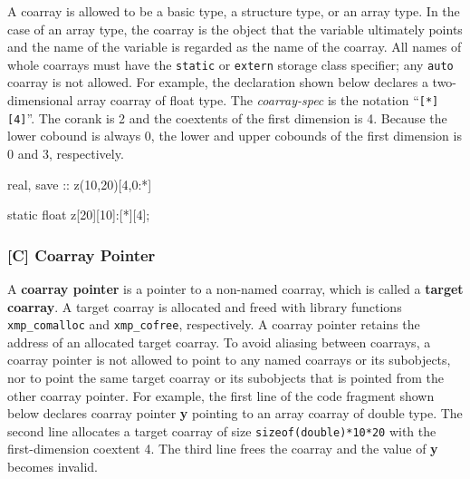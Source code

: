 {\onlyC}
A coarray is allowed to be a basic type, a structure type, or an array type.
In the case of an array type, the coarray is the object that the variable 
ultimately points and the name of the variable is regarded as the 
name of the coarray. 
All names of whole coarrays must have the {\tt static} or {\tt extern}
storage class specifier; any {\tt auto} coarray is not allowed.
For example, the declaration shown below declares a two-dimensional array
coarray of float type. 
The {\it coarray-spec} is the notation ``{\tt [*][4]}''.
The corank is 2 and the coextents of the first dimension is 4.
Because the lower cobound is always 0, the lower and upper cobounds of 
the first dimension is 0 and 3, respectively.

\begin{center}
 \begin{minipage}{0.48\hsize}
  \begin{XFexample}
  real, save :: z(10,20)[4,0:*]
  \end{XFexample}
 \end{minipage}
%
 \begin{minipage}{0.48\hsize}
  \begin{XCexampleR}
  static float z[20][10]:[*][4];
  \end{XCexampleR}
 \end{minipage}
\end{center}


\subsubsection*{[C] Coarray Pointer}

A {\bf coarray pointer} is a pointer to a non-named coarray, which is
called a {\bf target coarray}.
A target coarray is allocated and freed with library functions
{\tt xmp\_comalloc} and {\tt xmp\_cofree}, respectively.
A coarray pointer retains the address of an allocated target coarray.
To avoid aliasing between coarrays, a coarray pointer is not allowed to 
point to any named coarrays or its subobjects,
nor to point the same target coarray or its subobjects that is pointed from
the other coarray pointer.
For example, the first line of the code fragment shown below 
declares coarray pointer {\bf y} pointing to an array coarray 
of double type. 
The second line allocates a target coarray of size 
{\tt sizeof(double)*10*20} with the first-dimension coextent 4.
The third line frees the coarray and the value of {\bf y} becomes
invalid.

